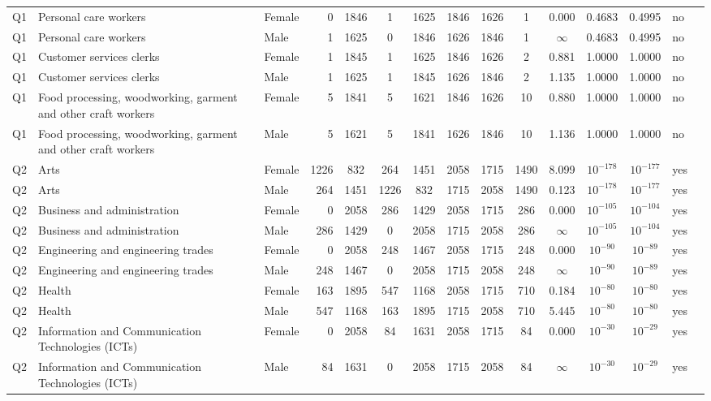 \begin{longtable}{lllrcccccccccll}
Q1 & Personal care workers & Female & 0 & 1846 & 1 & 1625 & 1846 & 1626 & 1 & 0.000 & 0.4683 & 0.4995 & no \\
Q1 & Personal care workers & Male & 1 & 1625 & 0 & 1846 & 1626 & 1846 & 1 & $\infty$ & 0.4683 & 0.4995 & no \\
Q1 & Customer services clerks & Female & 1 & 1845 & 1 & 1625 & 1846 & 1626 & 2 & 0.881 & 1.0000 & 1.0000 & no \\
Q1 & Customer services clerks & Male & 1 & 1625 & 1 & 1845 & 1626 & 1846 & 2 & 1.135 & 1.0000 & 1.0000 & no \\
Q1 & Food processing, woodworking, garment and other craft workers & Female & 5 & 1841 & 5 & 1621 & 1846 & 1626 & 10 & 0.880 & 1.0000 & 1.0000 & no \\
Q1 & Food processing, woodworking, garment and other craft workers & Male & 5 & 1621 & 5 & 1841 & 1626 & 1846 & 10 & 1.136 & 1.0000 & 1.0000 & no \\
Q2 & Arts & Female & 1226 & 832 & 264 & 1451 & 2058 & 1715 & 1490 & 8.099 & $10^{-178}$ & $10^{-177}$ & yes \\
Q2 & Arts & Male & 264 & 1451 & 1226 & 832 & 1715 & 2058 & 1490 & 0.123 & $10^{-178}$ & $10^{-177}$ & yes \\
Q2 & Business and administration & Female & 0 & 2058 & 286 & 1429 & 2058 & 1715 & 286 & 0.000 & $10^{-105}$ & $10^{-104}$ & yes \\
Q2 & Business and administration & Male & 286 & 1429 & 0 & 2058 & 1715 & 2058 & 286 & $\infty$ & $10^{-105}$ & $10^{-104}$ & yes \\
Q2 & Engineering and engineering trades & Female & 0 & 2058 & 248 & 1467 & 2058 & 1715 & 248 & 0.000 & $10^{-90}$ & $10^{-89}$ & yes \\
Q2 & Engineering and engineering trades & Male & 248 & 1467 & 0 & 2058 & 1715 & 2058 & 248 & $\infty$ & $10^{-90}$ & $10^{-89}$ & yes \\
Q2 & Health & Female & 163 & 1895 & 547 & 1168 & 2058 & 1715 & 710 & 0.184 & $10^{-80}$ & $10^{-80}$ & yes \\
Q2 & Health & Male & 547 & 1168 & 163 & 1895 & 1715 & 2058 & 710 & 5.445 & $10^{-80}$ & $10^{-80}$ & yes \\
Q2 & Information and Communication Technologies (ICTs) & Female & 0 & 2058 & 84 & 1631 & 2058 & 1715 & 84 & 0.000 & $10^{-30}$ & $10^{-29}$ & yes \\
Q2 & Information and Communication Technologies (ICTs) & Male & 84 & 1631 & 0 & 2058 & 1715 & 2058 & 84 & $\infty$ & $10^{-30}$ & $10^{-29}$ & yes \\

\end{longtable}
